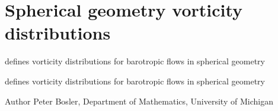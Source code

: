 \hypertarget{group___b_v_e_vorticity}{\section{Spherical geometry vorticity distributions}
\label{group___b_v_e_vorticity}
}


defines vorticity distributions for barotropic flows in spherical geometry  


defines vorticity distributions for barotropic flows in spherical geometry 

\begin{DoxyAuthor}{Author}
Peter Bosler, Department of Mathematics, University of Michigan 
\end{DoxyAuthor}
